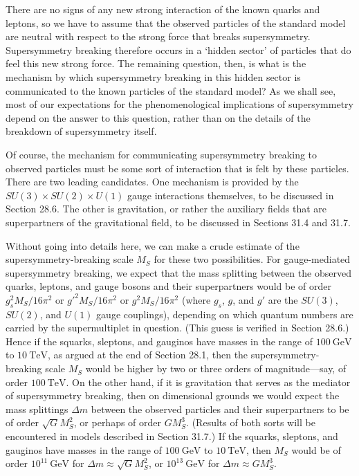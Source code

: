 There are no signs of any new strong interaction of the known quarks and
leptons, so we have to assume that the observed particles of the standard
model are neutral with respect to the strong force that breaks
supersymmetry. Supersymmetry breaking therefore occurs in a `hidden sector'
of particles that do feel this new strong force. The remaining question,
then, is what is the mechanism by which supersymmetry breaking in this
hidden sector is communicated to the known particles of the standard
model? As we shall see, most of our expectations for the phenomenological
implications of supersymmetry depend on the answer to this question, rather
than on the details of the breakdown of supersymmetry itself.

Of course, the mechanism for communicating supersymmetry breaking to
observed particles must be some sort of interaction that is felt by these
particles. There are two leading candidates. One mechanism is provided by
the \(SU(3)\times SU(2)\times U(1)\) gauge interactions themselves, to be
discussed in Section 28.6. The other is gravitation, or rather the auxiliary
fields that are superpartners of the gravitational field, to be discussed
in Sections 31.4 and 31.7.

Without going into details here, we can make a crude estimate of the
supersymmetry-breaking scale \(M_S\) for these two possibilities. For
gauge-mediated supersymmetry breaking, we expect that the mass splitting
between the observed quarks, leptons, and gauge bosons and their
superpartners would be of order \(g_s^2M_S/16\pi^2\) or
\(g'^2M_S/16\pi^2\) or \(g^2M_S/16\pi^2\) (where \(g_s\), \(g\), and
\(g'\) are the \(SU(3)\),
\(SU(2)\), and \(U(1)\) gauge couplings), depending on which quantum
numbers are carried by the supermultiplet in question. (This guess is
verified in Section 28.6.) Hence if the squarks, sleptons, and gauginos have
masses in the range of \(100\ \mathrm{GeV}\) to \(10\ \mathrm{TeV}\), as
argued at the end of Section 28.1, then the supersymmetry-breaking scale
\(M_S\) would be higher by two or three orders of magnitude---say, of order
\(100\ \mathrm{TeV}\). On the other hand, if it is gravitation that serves
as the mediator of supersymmetry breaking, then on dimensional grounds we
would expect the mass splittings \(\Delta m\) between the observed
particles and their superpartners to be of order \(\sqrt{G}M_S^2\), or
perhaps of order \(GM_S^3\). (Results of both sorts will be encountered in
models described in Section 31.7.) If the squarks, sleptons, and gauginos
have masses in the range of \(100\ \mathrm{GeV}\) to \(10\ \mathrm{TeV}\),
then \(M_S\) would be of order \(10^{11}\ \mathrm{GeV}\) for
\(\Delta m\approx\sqrt{G}M_S^2\), or \(10^{13}\ \mathrm{GeV}\) for
\(\Delta m\approx GM_S^3\).

